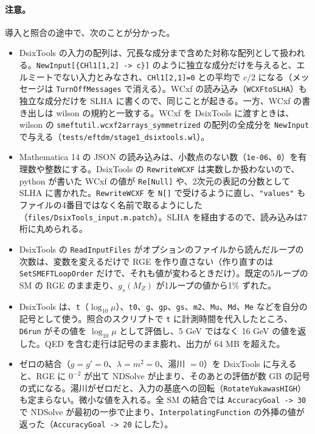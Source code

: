 \documentclass[a4paper,10pt]{ltjsarticle}
\begin{document}
\paragraph{注意。}導入と照合の途中で、次のことが分かった。
\begin{itemize}
\item DsixTools の入力の配列は、冗長な成分まで含めた対称な配列として扱われる。\texttt{NewInput[\{CHl1[1,2] -> c\}]} のように独立な成分だけを与えると、エルミートでない入力とみなされ、\texttt{CHl1[2,1]=0} との平均で $c/2$ になる（メッセージは \texttt{TurnOffMessages} で消える）。WCxf の読み込み（\texttt{WCXFtoSLHA}）も独立な成分だけを SLHA に書くので、同じことが起きる。一方、WCxf の書き出しは wilson の規約と一致する。WCxf を DsixTools に渡すときは、wilson の \texttt{smeftutil.wcxf2arrays\_symmetrized} の配列の全成分を \texttt{NewInput} で与える（\nolinkurl{tests/eftdm/stage1_dsixtools.wl}）。
\item Mathematica 14 の JSON の読み込みは、小数点のない数（\texttt{1e-06}、\texttt{0}）を有理数や整数にする。DsixTools の \texttt{RewriteWCXF} は実数しか扱わないので、python が書いた WCxf の値が \texttt{Re[Null]} や、2次元の表記の分数として SLHA に書かれた。\texttt{RewriteWCXF} を \texttt{N[]} で受けるように直し、\texttt{"values"} もファイルの4番目ではなく名前で取るようにした（\nolinkurl{files/DsixTools_input.m.patch}）。SLHA を経由するので、読み込みは7桁に丸められる。
\item DsixTools の \texttt{ReadInputFiles} がオプションのファイルから読んだループの次数は、変数を変えるだけで RGE を作り直さない（作り直すのは \texttt{SetSMEFTLoopOrder} だけで、それも値が変わるときだけ）。既定の5ループの SM の RGE のまま走り、$g_s(M_Z)$ が1ループの値から1\% ずれた。
\item DsixTools は、\texttt{t}（$\log_{10}\mu$）、\texttt{t0}、\texttt{g}、\texttt{gp}、\texttt{gs}、\texttt{m2}、\texttt{Mu}、\texttt{Md}、\texttt{Me} などを自分の記号として使う。照合のスクリプトで \texttt{t} に計測時間を代入したところ、\texttt{D6run} がその値を $\log_{10}\mu$ として評価し、5 GeV ではなく 16 GeV の値を返した。QED を含む走行は記号のまま膨れ、出力が 64 MB を超えた。
\item ゼロの結合（$g=g'=0$、$\lambda=m^2=0$、湯川 $=0$）を DsixTools に与えると、RGE に $0^{-2}$ が出て NDSolve が止まり、そのあとの評価が数 GB の記号の式になる。湯川がゼロだと、入力の基底への回転（\texttt{RotateYukawasHIGH}）も定まらない。微小な値を入れる。全 SM の結合では \texttt{AccuracyGoal -> 30} で NDSolve が最初の一歩で止まり、\texttt{InterpolatingFunction} の外挿の値が返った（\texttt{AccuracyGoal -> 20} にした）。

\end{itemize}
\end{document}
